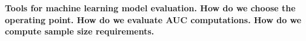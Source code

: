 \documentclass[onecolumn,,10pt]{IEEEtran}
\begin{document}
\maketitle 
 
\vspace{-15pt}
{\bf \sffamily \fontsize{10}{10} \selectfont
Tools for machine learning model evaluation. How do we choose the operating point. How do we evaluate AUC computations. How do we compute sample size requirements.
}







\end{document}

